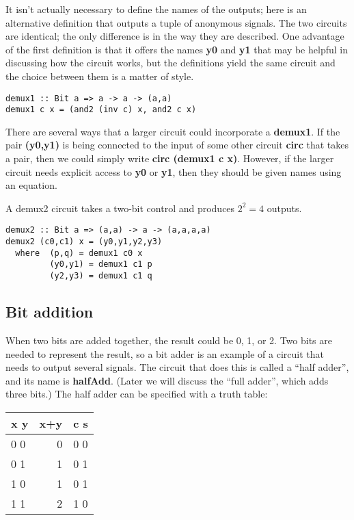\documentclass[11pt]{article}
\begin{document}
It isn't actually necessary to define the names of the outputs; here
is an alternative definition that outputs a tuple of anonymous
signals.  The two circuits are identical; the only difference is in
the way they are described.  One advantage of the first definition is
that it offers the names \textbf{y0} and \textbf{y1} that may be helpful in
discussing how the circuit works, but the definitions yield the same
circuit and the choice between them is a matter of style.


\begin{verbatim}
demux1 :: Bit a => a -> a -> (a,a)
demux1 c x = (and2 (inv c) x, and2 c x)
\end{verbatim}


There are several ways that a larger circuit could incorporate a
\textbf{demux1}.  If the pair \textbf{(y0,y1)} is being connected to the input of
some other circuit \textbf{circ} that takes a pair, then we could simply
write \textbf{circ (demux1 c x)}.  However, if the larger circuit needs
explicit access to \textbf{y0} or \textbf{y1}, then they should be given names using
an equation.

A demux2 circuit takes a two-bit control and produces \(2^{2} = 4\)
outputs.


\begin{verbatim}
demux2 :: Bit a => (a,a) -> a -> (a,a,a,a)
demux2 (c0,c1) x = (y0,y1,y2,y3)
  where  (p,q) = demux1 c0 x
         (y0,y1) = demux1 c1 p
         (y2,y3) = demux1 c1 q
\end{verbatim}

\subsection{Bit addition}
\label{sec:org4462a04}

When two bits are added together, the result could be 0, 1, or 2.  Two
bits are needed to represent the result, so a bit adder is an example
of a circuit that needs to output several signals.  The circuit that
does this is called a ``half adder'', and its name is \textbf{halfAdd}.
(Later we will discuss the ``full adder'', which adds three bits.)
The half adder can be specified with a truth table:

\begin{center}
\begin{tabular}{lrl}
x  y & x+y & c  s\\[0pt]
\hline
0  0 & 0 & 0  0\\[0pt]
0  1 & 1 & 0  1\\[0pt]
1  0 & 1 & 0  1\\[0pt]
1  1 & 2 & 1  0\\[0pt]
\end{tabular}
\end{center}
\end{document}
